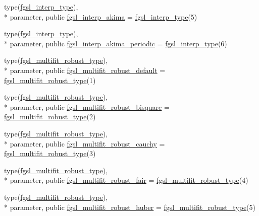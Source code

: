 \begin{DoxyCompactItemize}
\item 
type(\hyperlink{structfgsl_1_1fgsl__interp__type}{fgsl\-\_\-interp\-\_\-type}), \\*
parameter, public \hyperlink{classfgsl_a7da81682e22860ff3f743dcf2e80b6e5}{fgsl\-\_\-interp\-\_\-akima} = \hyperlink{structfgsl_1_1fgsl__interp__type}{fgsl\-\_\-interp\-\_\-type}(5)
\item 
type(\hyperlink{structfgsl_1_1fgsl__interp__type}{fgsl\-\_\-interp\-\_\-type}), \\*
parameter, public \hyperlink{classfgsl_ae51f422b992227f64fb8505b62335502}{fgsl\-\_\-interp\-\_\-akima\-\_\-periodic} = \hyperlink{structfgsl_1_1fgsl__interp__type}{fgsl\-\_\-interp\-\_\-type}(6)
\item 
type(\hyperlink{structfgsl_1_1fgsl__multifit__robust__type}{fgsl\-\_\-multifit\-\_\-robust\-\_\-type}), \\*
parameter, public \hyperlink{classfgsl_ac1a0aa1e007066fb5ae50fcae0e1c885}{fgsl\-\_\-multifit\-\_\-robust\-\_\-default} = \hyperlink{structfgsl_1_1fgsl__multifit__robust__type}{fgsl\-\_\-multifit\-\_\-robust\-\_\-type}(1)
\item 
type(\hyperlink{structfgsl_1_1fgsl__multifit__robust__type}{fgsl\-\_\-multifit\-\_\-robust\-\_\-type}), \\*
parameter, public \hyperlink{classfgsl_a36d1b09a0ed8ea4c5836ecc7e19e143a}{fgsl\-\_\-multifit\-\_\-robust\-\_\-bisquare} = \hyperlink{structfgsl_1_1fgsl__multifit__robust__type}{fgsl\-\_\-multifit\-\_\-robust\-\_\-type}(2)
\item 
type(\hyperlink{structfgsl_1_1fgsl__multifit__robust__type}{fgsl\-\_\-multifit\-\_\-robust\-\_\-type}), \\*
parameter, public \hyperlink{classfgsl_a106b8dc39c3609e38744526153f66d25}{fgsl\-\_\-multifit\-\_\-robust\-\_\-cauchy} = \hyperlink{structfgsl_1_1fgsl__multifit__robust__type}{fgsl\-\_\-multifit\-\_\-robust\-\_\-type}(3)
\item 
type(\hyperlink{structfgsl_1_1fgsl__multifit__robust__type}{fgsl\-\_\-multifit\-\_\-robust\-\_\-type}), \\*
parameter, public \hyperlink{classfgsl_a924cc37b78fb66006a7353005347bded}{fgsl\-\_\-multifit\-\_\-robust\-\_\-fair} = \hyperlink{structfgsl_1_1fgsl__multifit__robust__type}{fgsl\-\_\-multifit\-\_\-robust\-\_\-type}(4)
\item 
type(\hyperlink{structfgsl_1_1fgsl__multifit__robust__type}{fgsl\-\_\-multifit\-\_\-robust\-\_\-type}), \\*
parameter, public \hyperlink{classfgsl_a3f232d8677261e46e3b90159cdbe985a}{fgsl\-\_\-multifit\-\_\-robust\-\_\-huber} = \hyperlink{structfgsl_1_1fgsl__multifit__robust__type}{fgsl\-\_\-multifit\-\_\-robust\-\_\-type}(5)

\end{DoxyCompactItemize}
